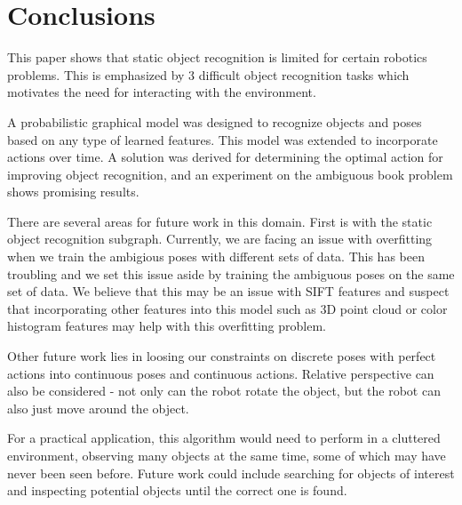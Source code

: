 \section{Conclusions}
    
    This paper shows that static object recognition is limited for certain robotics problems. This is emphasized by 3 difficult object recognition tasks which motivates the need for interacting with the environment. 

    A probabilistic graphical model was designed to recognize objects and poses based on any type of learned features. This model was extended to incorporate actions over time. A solution was derived for determining the optimal action for improving object recognition, and an experiment on the ambiguous book problem shows promising results.

    There are several areas for future work in this domain. First is with the static object recognition subgraph. Currently, we are facing an issue with overfitting when we train the ambigious poses with different sets of data. This has been troubling and we set this issue aside by training the ambiguous poses on the same set of data. We believe that this may be an issue with SIFT features and suspect that incorporating other features into this model such as 3D point cloud or color histogram features may help with this overfitting problem.

    Other future work lies in loosing our constraints on discrete poses with perfect actions into continuous poses and continuous actions. Relative perspective can also be considered - not only can the robot rotate the object, but the robot can also just move around the object.

    For a practical application, this algorithm would need to perform in a cluttered environment, observing many objects at the same time, some of which may have never been seen before. Future work could include searching for objects of interest and inspecting potential objects until the correct one is found.


